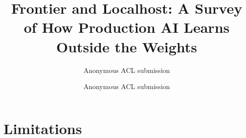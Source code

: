\documentclass[11pt]{article}
\title{Frontier and Localhost: A Survey of How Production AI Learns Outside the Weights}
\author{Anonymous ACL submission}
\author{Anonymous ACL submission}
\date{}
\begin{document}
\maketitle
\begin{abstract}

\end{abstract}



\section*{Limitations}\label{sec:limits}




\clearpage
\appendix

\end{document}
